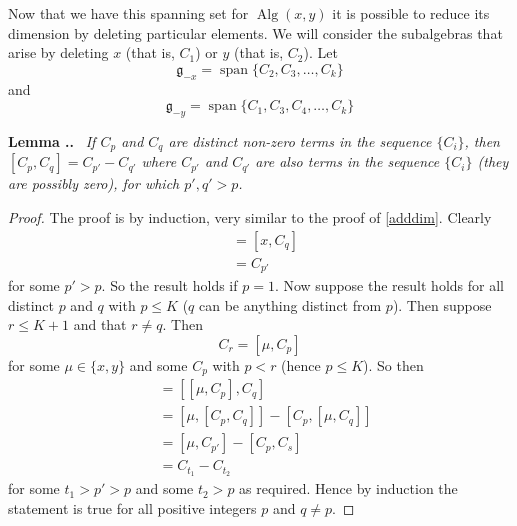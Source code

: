 \documentclass[honours]{UNSWthesis}
\newcommand{\g}{\mathfrak{g}}
\newcommand{\1}{\mathbf{e}_{1}}
\newcommand{\2}{\mathbf{e}_{3}}
\newcommand{\3}{\mathbf{e}_{3}}
\DeclareMathOperator{\alg}{Alg}
\DeclareMathOperator{\spn}{span}
\newcounter{Item}[section]
\newenvironment{Lemma}{\medskip
                            \refstepcounter{Item}
                            \noindent
                           {\bf Lemma \thesection.\theItem.}\ %
                            \begingroup \sl}
                           {\endgroup\medskip}
\begin{document}
Now that we have this spanning set for $\alg(x,y)$ it is possible to reduce its dimension by deleting particular elements. We will consider the subalgebras that arise by deleting $x$ (that is, $C_{1}$) or $y$ (that is, $C_{2}$). \newline
Let 
\[
\g_{-x}=\spn \{ C_{2},C_{3},\ldots,C_{k} \}
\]
and
\[
\g_{-y}=\spn \{C_{1},C_{3},C_{4},\ldots,C_{k} \}
\]

\begin{Lemma}\label{gohigher}
If $C_{p}$ and $C_{q}$ are distinct non-zero terms in the sequence $\{C_{i}\}$, then $[C_{p},C_{q}]= C_{p'}-C_{q'}$ where $C_{p'}$ and $C_{q'}$ are also terms in the sequence $\{C_{i}\}$ (they are possibly zero), for which  $p',q' > p$.
\end{Lemma}
\begin{proof}
The proof is by induction, very similar to the proof of \ref{adddim}. Clearly
\begin{align*}
[C_{1},C_{q}]&=[x,C_{q}]\\
&=C_{p'}
\end{align*}
for some $p'>p$. So the result holds if $p=1$. Now suppose the result holds for all distinct $p$ and $q$ with $p \leq K$ ($q$ can be anything distinct from $p$). Then suppose $r \leq K+1$ and that $r \neq q$. Then
\[
C_{r}=[\mu,C_{p}]
\]
for some $\mu \in \{x,y\}$ and some $C_{p}$ with $p < r$ (hence $p\leq K$). 
\newline
So then 
\begin{align*}
[C_{r},C_{q}]&=[[\mu,C_{p}],C_{q}]\\
&=[\mu,[C_{p},C_{q}]]-[C_{p},[\mu,C_{q}]] \\
&=[\mu,C_{p'}]-[C_{p},C_{s}]\\
&=C_{t_{1}}-C_{t_{2}}
\end{align*}
for some $t_{1}>p'>p$ and some $t_{2}>p$ as required. Hence by induction the statement is true for all positive integers $p$ and $q \neq p$.
\end{proof}
\end{document}
